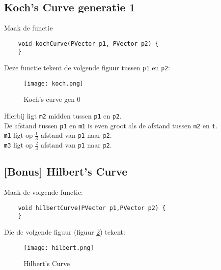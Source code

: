 \subsection{Koch's Curve generatie 1}
Maak de functie
\begin{lstlisting}
	void kochCurve(PVector p1, PVector p2) {
	}
\end{lstlisting}
Deze functie tekent de volgende figuur tussen \texttt{p1} en \texttt{p2}:
\begin{figure}[H]
	\centering
	\texttt{[image: koch.png]}
	\caption{Koch's curve gen 0}
	\label{fig:koch}
\end{figure}
Hierbij ligt \texttt{m2} midden tussen \texttt{p1} en \texttt{p2}.\\
De afstand tussen \texttt{p1} en \texttt{m1} is even groot als de afstand tussen \texttt{m2} en \texttt{t}.\\
\texttt{m1} ligt op $\frac{1}{3}$ afstand van \texttt{p1} naar \texttt{p2}.\\
\texttt{m3} ligt op $\frac{2}{3}$ afstand van \texttt{p1} naar \texttt{p2}.\\

\subsection{[Bonus] Hilbert's Curve}
Maak de volgende functie:
\begin{lstlisting}
	void hilbertCurve(PVector p1,PVector p2) {
	} 
\end{lstlisting}
Die de volgende figuur (figuur \ref{fig:koch}) tekent:
\begin{figure}[h!]
	\centering
	\texttt{[image: hilbert.png]}
	\caption{Hilbert's Curve}
	\label{fig:koch}
\end{figure}

